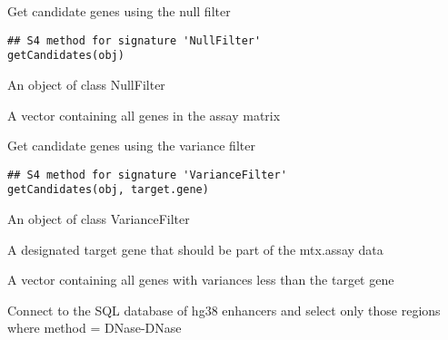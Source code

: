\documentclass[a4paper]{book}
\begin{document}
\begin{Description}\relax
Get candidate genes using the null filter
\end{Description}
%
\begin{Usage}
\begin{verbatim}
## S4 method for signature 'NullFilter'
getCandidates(obj)
\end{verbatim}
\end{Usage}
%
\begin{Arguments}
\begin{ldescription}
\item[\code{obj}] An object of class NullFilter
\end{ldescription}
\end{Arguments}
%
\begin{Value}
A vector containing all genes in the assay matrix
\end{Value}
%
\begin{Description}\relax
Get candidate genes using the variance filter
\end{Description}
%
\begin{Usage}
\begin{verbatim}
## S4 method for signature 'VarianceFilter'
getCandidates(obj, target.gene)
\end{verbatim}
\end{Usage}
%
\begin{Arguments}
\begin{ldescription}
\item[\code{obj}] An object of class VarianceFilter

\item[\code{target.gene}] A designated target gene that should be part of the mtx.assay data
\end{ldescription}
\end{Arguments}
%
\begin{Value}
A vector containing all genes with variances less than the target gene
\end{Value}
%
\begin{Description}\relax
Connect to the SQL database of hg38 enhancers and select only those regions where method = DNase-DNase
\end{Description}
\end{document}
